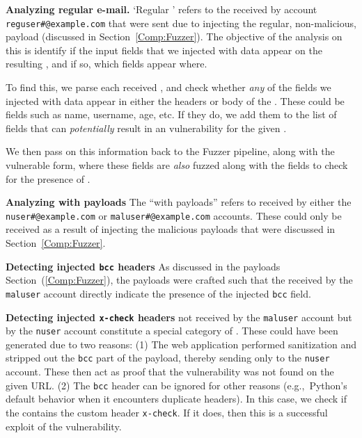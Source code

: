 \noindent\textbf{Analyzing regular e-mail.}
\sloppy
`Regular \email' refers to the \emails received by account {\lstinline{reguser#@example.com}} that were sent due to injecting the regular, non-malicious, payload (discussed in Section~\ref{Comp:Fuzzer}). The objective of the analysis on this \email is identify if the input fields that we injected with data appear on the resulting \email, and if so, which fields appear where.

To find this, we parse each received \email, and check whether \emph{any} of the fields we injected with data appear in either the headers or body of the \email. These could be fields such as name, username, age, etc. If they do, we add them to the list of fields that can \emph{potentially} result in an \ehi vulnerability for the given \email. 

We then pass on this information back to the Fuzzer pipeline, along with the vulnerable form, where these fields are \emph{also} fuzzed along with the \email fields to check for the presence of \ehi.

\noindent\textbf{Analyzing \email with payloads}
The ``\emails with payloads'' refers to \emails received by either the {\lstinline{nuser#@example.com}} or {\lstinline{maluser#@example.com}} accounts. These \emails could only be received as a result of injecting the malicious payloads that were discussed in Section~\ref{Comp:Fuzzer}. 

\noindent\textbf{Detecting injected \texttt{bcc} headers}
As discussed in the payloads Section~(\ref{Comp:Fuzzer}), the payloads were crafted such that the \emails received by the \texttt{maluser} account directly indicate the presence of the injected \texttt{bcc} field. 

\label{analyze:detect_x_check}
\noindent\textbf{Detecting injected \texttt{x-check} headers} \Emails
not received by the \texttt{maluser} account but by the \texttt{nuser}
account constitute a special category of \emails. These \emails could
have been generated due to two reasons: (1) The web application
performed sanitization and stripped out the \texttt{bcc}
part of the payload, thereby sending \emails only to the
\texttt{nuser} account. These \emails then act as proof that the
vulnerability was not found on the given URL. (2) The \texttt{bcc}
header can be ignored for other reasons (e.g.,\ Python's default
behavior when it encounters duplicate headers). In this case, we check
if the \email contains the custom header \texttt{x-check}. If it does,
then this is a successful exploit of the vulnerability.
